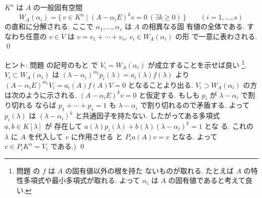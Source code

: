 \documentclass[12pt,twoside]{jarticle}
\begin{document}

\begin{question}[一般固有空間分解]
\label{q:generalized-eigenspace}
  $K^n$ は $A$ の一般固有空間
  \begin{equation*}
    W_A(\alpha_i) 
    = \{\, v\in K^n \mid (A-\alpha_i E)^k v = 0\ (\exists k \ge 0)\,\}
    \qquad (i=1,\dots,s)
  \end{equation*}
  の直和に分解される.  ここで $\alpha_1,\dots,\alpha_s$ は $A$ の相異なる固
  有値の全体である.  
  すなわち任意の $v\in V$ は $v=v_1+\cdots+v_s$, $v_i\in W_A(\alpha_i)$ の形
  で一意に表わされる. 
  \qed
\end{question}

\noindent
ヒント:  問題  の記号のもと
で $V_i=W_A(\alpha_i)$ が成立することを示せば良い%
\footnote{問題  の $f$ は $A$ の固有値以外の根を持た
  ないものが取れる. たとえば $A$ の特性多項式や最小多項式が取れる.
  よって $\alpha_i$ は $A$ の固有値であると考えて良い.}.
$V_i\subset W_A(\alpha_i)$ 
は $(\lambda-\alpha_i)^{m_i}p_i(\lambda)=a_i(\lambda)f(\lambda)$ 
より $(A - \alpha_i E)^{m_i}V_i = a_i(A)f(A)V = 0$ となることより出る.
$V_i\supset W_A(\alpha_i)$ の方は次のように示される.
$(A-\alpha_iE)^kv=0$ と仮定する.
もしも $p_i$ が $\lambda-\alpha_i$ で割り切れる
ならば $p_1+\cdots+p_s=1$ も $\lambda-\alpha_i$ で割り切れるので矛盾する.
よって $p_i(\lambda)$ は $(\lambda-\alpha_i)^k$ と共通因子を持たない.
したがってある多項式 $a,b\in K[\lambda]$ が
存在して $a(\lambda)p_i(\lambda)+b(\lambda)(\lambda-\alpha_i)^k=1$ とな
る.  これの $\lambda$ に $A$ を代入して $v$ に作用させる
と $P_ia(A)v = v$ となる.  よって $v\in P_iK^n=V_i$ である.)
\qed

\end{document}
